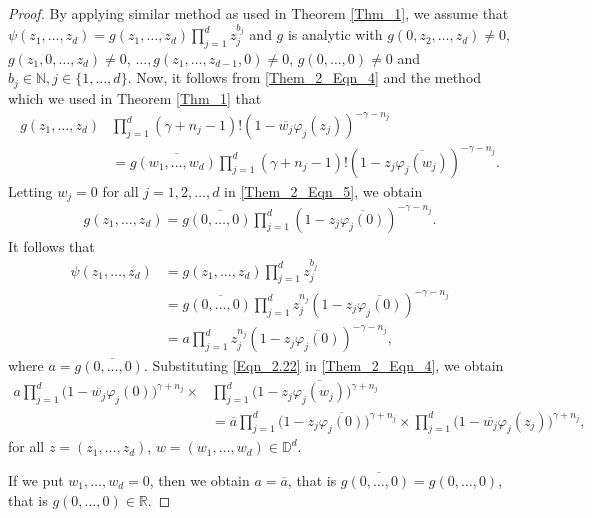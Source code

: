 \documentclass[12pt, reqno]{amsart}
\theoremstyle{definition}
\theoremstyle{remark}
\numberwithin{equation}{section}
\begin{document}
\begin{proof}
 By applying similar method as used in Theorem \ref{Thm_1}, we assume that   
  $\psi(z_1, \dots, z_d)=g(z_1, \dots, z_d)\prod_{j=1}^dz_j^{b_j}$ and $g$ is analytic with $g(0, z_2, \dots, z_d)\neq 0$, $g(z_1, 0, \dots, z_d)\neq 0$, $\dots, g(z_1, \dots, z_{d-1},0)\neq 0$, $g(0,  \dots, 0)\neq 0$ and $b_j\in \mathbb{N}, j\in \{ 
 	1, \dots, d\}$.
 	Now, it follows from \eqref{Them_2_Eqn_4} and the method which we used in Theorem \ref{Thm_1} that
 	\begin{align}\label{Them_2_Eqn_5}
 	g(z_1, \dots, z_d)&\prod_{j=1}^d(\gamma+n_j-1)!(1-\overline{w_j}\varphi_j(z_j))^{-\gamma-n_j}\nonumber\\
 	&=g\overline{(w_1, \dots, w_d)}\prod_{j=1}^d(\gamma+n_j-1)!(1-z_j\overline{\varphi_j(w_j)})^{-\gamma-n_j}.
 	\end{align}
 	 	Letting $w_j=0$ for all $j=1, 2, \dots, d$ in \eqref{Them_2_Eqn_5}, we obtain
 	\begin{align*}
 	g(z_1, \dots, z_d)=g\overline{(0, \dots, 0)}\prod_{j=1}^d(1-z_j\overline{\varphi_j(0)})^{-\gamma-n_j}.
 	\end{align*}
 	It follows that  
 	\begin{align}\label{Eqn_2.22}
 		\psi(z_1, \dots, z_d)&=g(z_1, \dots, z_d)\prod_{j=1}^dz_j^{b_j}\nonumber\\
 		&=g\overline{(0, \dots, 0)}\prod_{j=1}^dz_j^{n_j}(1-z_j\overline{\varphi_j(0)})^{-\gamma-n_j}\nonumber\\
 			&=a\prod_{j=1}^dz_j^{n_j}(1-z_j\overline{\varphi_j(0)})^{-\gamma-n_j},
 	 	\end{align}
 	where $a=g\overline{(0, \dots, 0)}$. 	
 	Substituting \eqref{Eqn_2.22} in \eqref{Them_2_Eqn_4}, we obtain 	
 	 	\begin{align}\label{Them_2_Eqn_11}
 	a \prod_{j=1}^d \big(1-\overline{w_j}\varphi_j(0)\big)^{\gamma+n_j}\times	&\prod_{j=1}^d\big(1-z_j\overline{\varphi_j(w_j)}\big)^{\gamma+n_j}\nonumber\\
 	&=\overline{a}\prod_{j=1}^d\big(1-z_j\overline{\varphi_j(0)}\big)^{\gamma+n_j}\times	\prod_{j=1}^d\big(1-\overline{w_j}\varphi_j(z_j)\big)^{\gamma+n_j},
 	\end{align}
 for all $z=(z_1, \dots, z_d)$, $w=(w_1, \dots, w_d)\in \mathbb{D}^d$.
 
 If we put $w_1, \dots, w_d=0$, then we obtain $a=\overline{a}$, that is  $g\overline{(0, \dots, 0)}=g(0, \dots, 0) $, that is $g(0, \dots, 0)\in \mathbb{R}$. 
 

\end{proof}
\end{document}

